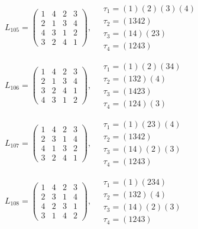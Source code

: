 $L_{105} = \begin{pmatrix} 1 & 4 & 2 & 3 \\ 2 & 1 & 3 & 4 \\ 4 & 3 & 1 & 2 \\ 3 & 2 & 4 & 1 \end{pmatrix}, \quad \begin{matrix} \tau_{1} = (1)(2)(3)(4) \\ \tau_{2} = (1 3 4 2) \\ \tau_{3} = (1 4)(2 3) \\ \tau_{4} = (1 2 4 3) \end{matrix}$

$L_{106} = \begin{pmatrix} 1 & 4 & 2 & 3 \\ 2 & 1 & 3 & 4 \\ 3 & 2 & 4 & 1 \\ 4 & 3 & 1 & 2 \end{pmatrix}, \quad \begin{matrix} \tau_{1} = (1)(2)(3 4) \\ \tau_{2} = (1 3 2)(4) \\ \tau_{3} = (1 4 2 3) \\ \tau_{4} = (1 2 4)(3) \end{matrix}$

$L_{107} = \begin{pmatrix} 1 & 4 & 2 & 3 \\ 2 & 3 & 1 & 4 \\ 4 & 1 & 3 & 2 \\ 3 & 2 & 4 & 1 \end{pmatrix}, \quad \begin{matrix} \tau_{1} = (1)(2 3)(4) \\ \tau_{2} = (1 3 4 2) \\ \tau_{3} = (1 4)(2)(3) \\ \tau_{4} = (1 2 4 3) \end{matrix}$

$L_{108} = \begin{pmatrix} 1 & 4 & 2 & 3 \\ 2 & 3 & 1 & 4 \\ 4 & 2 & 3 & 1 \\ 3 & 1 & 4 & 2 \end{pmatrix}, \quad \begin{matrix} \tau_{1} = (1)(2 3 4) \\ \tau_{2} = (1 3 2)(4) \\ \tau_{3} = (1 4)(2)(3) \\ \tau_{4} = (1 2 4 3) \end{matrix}$

